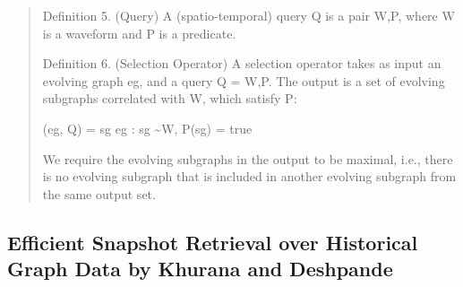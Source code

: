 \documentclass[10pt]{article}
\begin{document}
\begin{quote}
Definition 5. (Query) A (spatio-temporal) query Q is a pair {W,P}, where W is a waveform and P is a predicate.

Definition 6. (Selection Operator) A selection operator takes as input an evolving graph eg, and a query Q = {W,P}. The output is a set of evolving subgraphs correlated with W, which satisfy P:

\sigma(eg, Q) = {sg \subseteq eg : sg \sim W, P(sg) = true}

We require the evolving subgraphs in the output to be maximal, i.e., there is no evolving subgraph that is included in another evolving subgraph from the same output set.
\end{quote}

\subsection{Efficient Snapshot Retrieval over Historical Graph Data by Khurana and Deshpande \cite{Khurana2013}}
\end{document}
